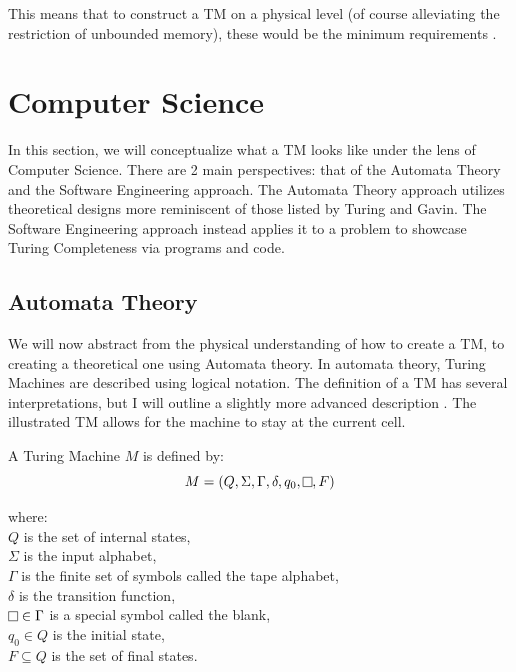 This means that to construct a TM on a physical level (of course alleviating the restriction of unbounded memory), these would be the minimum requirements \cite{nand2tetris,ELTCompSys}.

\section{Computer Science}\label{sec:CompSci}

In this section, we will conceptualize what a TM looks like under the lens of Computer Science.
There are 2 main perspectives: that of the Automata Theory and the Software Engineering approach.
The Automata Theory approach utilizes theoretical designs more reminiscent of those listed by Turing and Gavin.
The Software Engineering approach instead applies it to a problem to showcase Turing Completeness via programs and code.

\subsection{Automata Theory}\label{subsec:AutomataThy}

We will now abstract from the physical understanding of how to create a TM, to creating a theoretical one using Automata theory.
In automata theory, Turing Machines are described using logical notation.
The definition of a TM has several interpretations, but I will outline a slightly more advanced description \cite{IntroFormLangAuto,TuBB}.
The illustrated TM allows for the machine to stay at the current cell.

\begin{definition}
    \label{def:TM}
    A Turing Machine $M$ is defined by:
        \[M = (Q, \Sigma ,\Gamma, \delta, q_{0}, \raisebox{0.1cm}{\fbox{}}, F)\]
        \par \hangindent=3cm 
        where: \\
        \( Q \) is the set of internal states,\\
        \( \Sigma \) is the input alphabet,\\
        \( \Gamma \) is the finite set of symbols called the tape alphabet,\\
        \( \delta \) is the transition function,\\
        \( \raisebox{0.1cm}{\fbox{}} \in \Gamma \) is a special symbol called the blank,\\
        \( q_{0} \in Q \) is the initial state,\\
        \( F \subseteq Q \) is the set of final states.
\end{definition}

